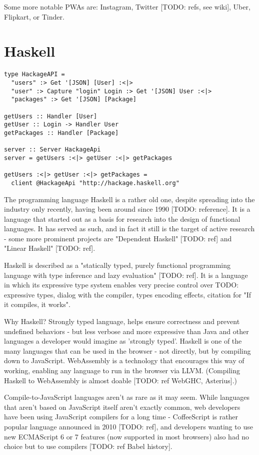 \documentclass[english,odsaz]{fitthesis}
\begin{document}
Some more notable PWAs are: Instagram, Twitter [TODO: refs, see wiki], Uber,
Flipkart, or Tinder.

\section{Haskell}
\label{sec:org1fe8799}
\begin{verbatim}
type HackageAPI =
  "users" :> Get '[JSON] [User] :<|>
  "user" :> Capture "login" Login :> Get '[JSON] User :<|>
  "packages" :> Get '[JSON] [Package]

getUsers :: Handler [User]
getUser :: Login -> Handler User
getPackages :: Handler [Package]

server :: Server HackageApi
server = getUsers :<|> getUser :<|> getPackages

getUsers :<|> getUser :<|> getPackages =
  client @HackageApi "http://hackage.haskell.org"
\end{verbatim}

The programming language Haskell is a rather old one, despite spreading into the
industry only recently, having been around since 1990 [TODO: reference]. It is a
language that started out as a basis for research into the design of functional
languages. It has served as such, and in fact it still is the target of active
research - some more prominent projects are "Dependent Haskell" [TODO: ref] and
"Linear Haskell" [TODO: ref].

Haskell is described as a "statically typed, purely functional programming
language with type inference and lazy evaluation" [TODO: ref]. It is a language
in which its expressive type system enables very precise control over TODO:
expressive types, dialog with the compiler, types encoding effects, citation for
"If it compiles, it works".

Why Haskell? Strongly typed language, helps ensure correctness and prevent
undefined behaviors - but less verbose and more expressive than Java and other
languages a developer would imagine as 'strongly typed'. Haskell is one of the
many languages that can be used in the browser - not directly, but by compiling
down to JavaScript. WebAssembly is a technology that encourages this way
of working, enabling any language to run in the browser via LLVM. (Compiling
Haskell to WebAssembly is almost doable [TODO: ref WebGHC, Asterius].)

Compile-to-JavaScript languages aren't as rare as it may seem. While languages
that aren't based on JavaScript itself aren't exactly common, web developers
have been using JavaScript compilers for a long time - CoffeeScript is rather
popular language announced in 2010 [TODO: ref], and developers wanting to use
new ECMAScript 6 or 7 features (now supported in most browsers) also had no
choice but to use compilers [TODO: ref Babel history].
\end{document}
